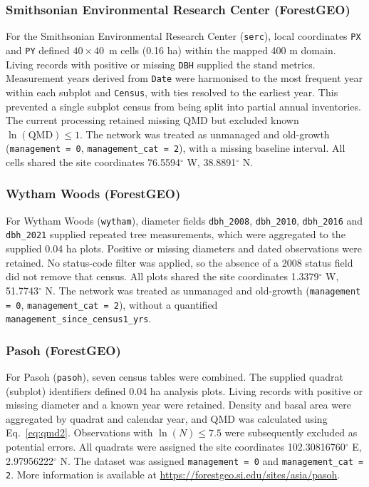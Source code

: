 \documentclass{myreport}
\begin{document}
% 


\subsubsection{Smithsonian Environmental Research Center (ForestGEO)}
For the Smithsonian Environmental Research Center (\texttt{serc}), local coordinates \texttt{PX} and \texttt{PY} defined $40\times40$~m cells (0.16 ha) within the mapped 400 m domain. Living records with positive or missing \texttt{DBH} supplied the stand metrics. Measurement years derived from \texttt{Date} were harmonised to the most frequent year within each subplot and \texttt{Census}, with ties resolved to the earliest year. This prevented a single subplot census from being split into partial annual inventories. The current processing retained missing QMD but excluded known $\ln(\mathrm{QMD})\leq1$. The network was treated as unmanaged and old-growth (\texttt{management = 0}, \texttt{management\_cat = 2}), with a missing baseline interval. All cells shared the site coordinates 76.5594$^\circ$ W, 38.8891$^\circ$ N.

% 

\subsubsection{Wytham Woods (ForestGEO)}
For Wytham Woods (\texttt{wytham}), diameter fields \texttt{dbh\_2008}, \texttt{dbh\_2010}, \texttt{dbh\_2016} and \texttt{dbh\_2021} supplied repeated tree measurements, which were aggregated to the supplied 0.04 ha plots. Positive or missing diameters and dated observations were retained. No status-code filter was applied, so the absence of a 2008 status field did not remove that census. All plots shared the site coordinates 1.3379$^\circ$ W, 51.7743$^\circ$ N. The network was treated as unmanaged and old-growth (\texttt{management = 0}, \texttt{management\_cat = 2}), without a quantified \texttt{management\_since\_census1\_yrs}.

% 

\subsubsection{Pasoh (ForestGEO)}
For Pasoh (\texttt{pasoh}), seven census tables were combined. The supplied quadrat (subplot) identifiers defined 0.04 ha analysis plots. Living records with positive or missing diameter and a known year were retained. Density and basal area were aggregated by quadrat and calendar year, and QMD was calculated using Eq.~\ref{eq:qmd2}. Observations with $\ln(N) \leq 7.5$ were subsequently excluded as potential errors. All quadrats were assigned the site coordinates 102.30816760$^\circ$ E, 2.97956222$^\circ$ N. The dataset was assigned \texttt{management = 0} and \texttt{management\_cat = 2}. More information is available at \url{https://forestgeo.si.edu/sites/asia/pasoh}.
\end{document}
